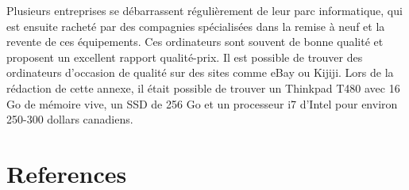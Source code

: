 \documentclass[
  letterpaper,
  DIV=11,
  numbers=noendperiod]{scrreprt}
\begin{document}
Plusieurs entreprises se débarrassent régulièrement de leur parc
informatique, qui est ensuite racheté par des compagnies spécialisées
dans la remise à neuf et la revente de ces équipements. Ces ordinateurs
sont souvent de bonne qualité et proposent un excellent rapport
qualité-prix. Il est possible de trouver des ordinateurs d'occasion de
qualité sur des sites comme eBay ou Kijiji. Lors de la rédaction de
cette annexe, il était possible de trouver un Thinkpad T480 avec 16 Go
de mémoire vive, un SSD de 256 Go et un processeur i7 d'Intel pour
environ 250-300 dollars canadiens.


\chapter*{References}\label{references}

\end{document}
